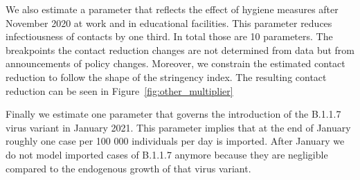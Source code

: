 We also estimate a parameter that reflects the effect of hygiene measures
after November 2020 at work and in educational facilities. This parameter reduces
infectiousness of contacts by one third. In total those are 10 parameters. The
breakpoints the contact reduction changes are not determined from data but from
announcements of policy changes. Moreover, we constrain the estimated contact reduction
to follow the shape of the stringency index. The resulting contact reduction can be
seen in Figure~\ref{fig:other_multiplier}


Finally we estimate one parameter that governs the introduction of the B.1.1.7 virus
variant in January 2021. This parameter implies that at the end of January roughly one
case per 100 000 individuals per day is imported. After January we do not model imported
cases of B.1.1.7 anymore because they are negligible compared to the endogenous growth
of that virus variant.





